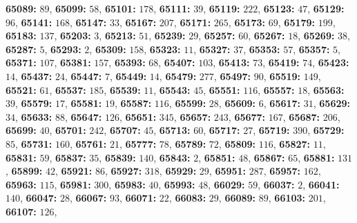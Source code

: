 \textsf{\bfseries 65089:} $89$, \textsf{\bfseries 65099:} $58$, \textsf{\bfseries 65101:} $178$, \textsf{\bfseries 65111:} $39$, \textsf{\bfseries 65119:} $222$, \textsf{\bfseries 65123:} $47$, \textsf{\bfseries 65129:} $96$, \textsf{\bfseries 65141:} $168$, \textsf{\bfseries 65147:} $33$, \textsf{\bfseries 65167:} $207$, \textsf{\bfseries 65171:} $265$, \textsf{\bfseries 65173:} $69$, \textsf{\bfseries 65179:} $199$, \textsf{\bfseries 65183:} $137$, \textsf{\bfseries 65203:} $3$, \textsf{\bfseries 65213:} $51$, \textsf{\bfseries 65239:} $29$, \textsf{\bfseries 65257:} $60$, \textsf{\bfseries 65267:} $18$, \textsf{\bfseries 65269:} $38$, \textsf{\bfseries 65287:} $5$, \textsf{\bfseries 65293:} $2$, \textsf{\bfseries 65309:} $158$, \textsf{\bfseries 65323:} $11$, \textsf{\bfseries 65327:} $37$, \textsf{\bfseries 65353:} $57$, \textsf{\bfseries 65357:} $5$, \textsf{\bfseries 65371:} $107$, \textsf{\bfseries 65381:} $157$, \textsf{\bfseries 65393:} $68$, \textsf{\bfseries 65407:} $103$, \textsf{\bfseries 65413:} $73$, \textsf{\bfseries 65419:} $74$, \textsf{\bfseries 65423:} $14$, \textsf{\bfseries 65437:} $24$, \textsf{\bfseries 65447:} $7$, \textsf{\bfseries 65449:} $14$, \textsf{\bfseries 65479:} $277$, \textsf{\bfseries 65497:} $90$, \textsf{\bfseries 65519:} $149$, \textsf{\bfseries 65521:} $61$, \textsf{\bfseries 65537:} $185$, \textsf{\bfseries 65539:} $11$, \textsf{\bfseries 65543:} $45$, \textsf{\bfseries 65551:} $116$, \textsf{\bfseries 65557:} $18$, \textsf{\bfseries 65563:} $39$, \textsf{\bfseries 65579:} $17$, \textsf{\bfseries 65581:} $19$, \textsf{\bfseries 65587:} $116$, \textsf{\bfseries 65599:} $28$, \textsf{\bfseries 65609:} $6$, \textsf{\bfseries 65617:} $31$, \textsf{\bfseries 65629:} $34$, \textsf{\bfseries 65633:} $88$, \textsf{\bfseries 65647:} $126$, \textsf{\bfseries 65651:} $345$, \textsf{\bfseries 65657:} $243$, \textsf{\bfseries 65677:} $167$, \textsf{\bfseries 65687:} $206$, \textsf{\bfseries 65699:} $40$, \textsf{\bfseries 65701:} $242$, \textsf{\bfseries 65707:} $45$, \textsf{\bfseries 65713:} $60$, \textsf{\bfseries 65717:} $27$, \textsf{\bfseries 65719:} $390$, \textsf{\bfseries 65729:} $85$, \textsf{\bfseries 65731:} $160$, \textsf{\bfseries 65761:} $21$, \textsf{\bfseries 65777:} $78$, \textsf{\bfseries 65789:} $72$, \textsf{\bfseries 65809:} $116$, \textsf{\bfseries 65827:} $11$, \textsf{\bfseries 65831:} $59$, \textsf{\bfseries 65837:} $35$, \textsf{\bfseries 65839:} $140$, \textsf{\bfseries 65843:} $2$, \textsf{\bfseries 65851:} $48$, \textsf{\bfseries 65867:} $65$, \textsf{\bfseries 65881:} $131$, \textsf{\bfseries 65899:} $42$, \textsf{\bfseries 65921:} $86$, \textsf{\bfseries 65927:} $318$, \textsf{\bfseries 65929:} $29$, \textsf{\bfseries 65951:} $287$, \textsf{\bfseries 65957:} $162$, \textsf{\bfseries 65963:} $115$, \textsf{\bfseries 65981:} $300$, \textsf{\bfseries 65983:} $40$, \textsf{\bfseries 65993:} $48$, \textsf{\bfseries 66029:} $59$, \textsf{\bfseries 66037:} $2$, \textsf{\bfseries 66041:} $140$, \textsf{\bfseries 66047:} $28$, \textsf{\bfseries 66067:} $93$, \textsf{\bfseries 66071:} $22$, \textsf{\bfseries 66083:} $29$, \textsf{\bfseries 66089:} $89$, \textsf{\bfseries 66103:} $201$, \textsf{\bfseries 66107:} $126$, 

